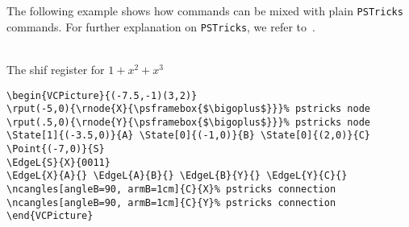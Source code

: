 \documentclass[11pt,twoside]{article}
\newlength{\parindenttemp} %
\newcommand{\noi}{\noindent}
\newlength{\jsIndent}%
\newlength{\ColSource}%
\newlength{\ColFigur}%
\newcommand{\PSTricks}{\texttt{PSTricks}\xspace}
\begin{document}
{The following example shows how \VCSG commands can be mixed
with plain \PSTricks commands. For further explanation on
\PSTricks, we refer to~\cite{Girou94,GRM97,GRMRV07,Voss07}.


\noi 
\hspace*{-\jsIndent}
\begin{minipage}[t]{\ColFigur}%
\par\vspace*{0mm}%
\bigskip 
\begin{center}
\\The shif register for $1+x^2+x^3$
\end{center}
\end{minipage}%
\hspace*{1.2em}%
\begin{minipage}[t]{\ColSource}
\setlength{\parindent}{\parindenttemp}%
\par\vspace*{0mm}%
\footnotesize
\begin{verbatim}
\begin{VCPicture}{(-7.5,-1)(3,2)}
\rput(-5,0){\rnode{X}{\psframebox{$\bigoplus$}}}% pstricks node
\rput(.5,0){\rnode{Y}{\psframebox{$\bigoplus$}}}% pstricks node
\State[1]{(-3.5,0)}{A} \State[0]{(-1,0)}{B} \State[0]{(2,0)}{C}
\Point{(-7,0)}{S}
\EdgeL{S}{X}{0011}
\EdgeL{X}{A}{} \EdgeL{A}{B}{} \EdgeL{B}{Y}{} \EdgeL{Y}{C}{}
\ncangles[angleB=90, armB=1cm]{C}{X}% pstricks connection
\ncangles[angleB=90, armB=1cm]{C}{Y}% pstricks connection
\end{VCPicture}
\end{verbatim}
\normalsize
\end{minipage}%
%

% 

}
\end{document}
